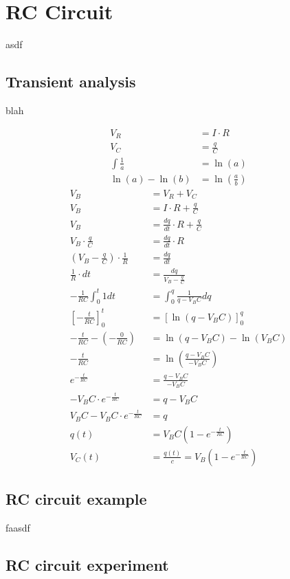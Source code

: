 \section{RC Circuit}
asdf
\subsection{Transient analysis}
blah

\begin{align}
V_R &= I \cdot R \\
V_C &= \frac{q}{C} \\
\int \frac{1}{a} &= \ln(a) \\
\ln(a) - \ln(b) &= \ln(\frac{a}{b})
\end{align}
\begin{align*}
V_B &= V_R + V_C \\
V_B &= I \cdot R + \frac{q}{C} \\
V_B &= \frac{dq}{dt} \cdot R + \frac{q}{C} \\
V_B \cdot \frac{q}{C} &= \frac{dq}{dt} \cdot R \\
(V_B - \frac{q}{C}) \cdot \frac{1}{R} &= \frac{dq}{dt} \\
\frac{1}{R} \cdot dt &= \frac{dq}{V_B - \frac{q}{C}} \\
- \frac{1}{RC} \int_{0}^{t} 1 dt &= \int_{0}^{q} \frac{1}{q-V_B C}dq \\
[-\frac{t}{RC}]_{0}^{t} &= [\ln(q-V_B C)]_{0}^{q} \\
-\frac{t}{RC} - (-\frac{0}{RC}) &= \ln(q-V_B C) - \ln(V_B C) \\
-\frac{t}{RC} &= \ln(\frac{q-V_B C}{-V_B C}) \\
e^{-\frac{t}{RC}} &= \frac{q-V_B C}{-V_B C} \\
-V_B C \cdot e^{-\frac{t}{RC}} &= q - V_B C \\
V_B C - V_B C \cdot e^{-\frac{t}{RC}} &= q \\
q(t) &= V_B C(1-e^{-\frac{t}{RC}}) \\
V_C(t) &= \frac{q(t)}{c} = V_B (1 - e^{-\frac{t}{RC}})
\end{align*}

\subsection{RC circuit example}
faasdf

\subsection{RC circuit experiment}



